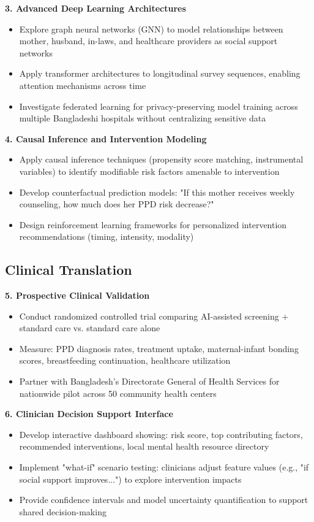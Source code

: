 \textbf{3. Advanced Deep Learning Architectures}
\begin{itemize}
    \item Explore graph neural networks (GNN) to model relationships between mother, husband, in-laws, and healthcare providers as social support networks
    \item Apply transformer architectures to longitudinal survey sequences, enabling attention mechanisms across time
    \item Investigate federated learning for privacy-preserving model training across multiple Bangladeshi hospitals without centralizing sensitive data
\end{itemize}

\textbf{4. Causal Inference and Intervention Modeling}
\begin{itemize}
    \item Apply causal inference techniques (propensity score matching, instrumental variables) to identify modifiable risk factors amenable to intervention
    \item Develop counterfactual prediction models: "If this mother receives weekly counseling, how much does her PPD risk decrease?"
    \item Design reinforcement learning frameworks for personalized intervention recommendations (timing, intensity, modality)
\end{itemize}

\subsection{Clinical Translation}

\textbf{5. Prospective Clinical Validation}
\begin{itemize}
    \item Conduct randomized controlled trial comparing AI-assisted screening + standard care vs. standard care alone
    \item Measure: PPD diagnosis rates, treatment uptake, maternal-infant bonding scores, breastfeeding continuation, healthcare utilization
    \item Partner with Bangladesh's Directorate General of Health Services for nationwide pilot across 50 community health centers
\end{itemize}

\textbf{6. Clinician Decision Support Interface}
\begin{itemize}
    \item Develop interactive dashboard showing: risk score, top contributing factors, recommended interventions, local mental health resource directory
    \item Implement "what-if" scenario testing: clinicians adjust feature values (e.g., "if social support improves...") to explore intervention impacts
    \item Provide confidence intervals and model uncertainty quantification to support shared decision-making
\end{itemize}

